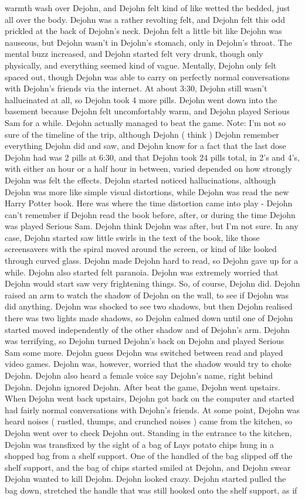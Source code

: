 \documentclass[12pt]{book}
\begin{document}
warmth wash over Dejohn, and Dejohn felt kind of like wetted the bedded, just all over the body. Dejohn was a rather revolting felt, and Dejohn felt this odd prickled at the back of Dejohn's neck. Dejohn felt a little bit like Dejohn was nauseous, but Dejohn wasn't in Dejohn's stomach, only in Dejohn's throat. The mental buzz increased, and Dejohn started felt very drunk, though only physically, and everything seemed kind of vague. Mentally, Dejohn only felt spaced out, though Dejohn was able to carry on perfectly normal conversations with Dejohn's friends via the internet. At about 3:30, Dejohn still wasn't hallucinated at all, so Dejohn took 4 more pills. Dejohn went down into the basement because Dejohn felt uncomfortably warm, and Dejohn played Serious Sam for a while. Dejohn actually managed to beat the game. Note: I'm not so sure of the timeline of the trip, although Dejohn ( think ) Dejohn remember everything Dejohn did and saw, and Dejohn know for a fact that the last dose Dejohn had was 2 pills at 6:30, and that Dejohn took 24 pills total, in 2's and 4's, with either an hour or a half hour in between, varied depended on how strongly Dejohn was felt the effects. Dejohn started noticed hallucinations, although Dejohn was more like simple visual distortions, while Dejohn was read the new Harry Potter book. Here was where the time distortion came into play - Dejohn can't remember if Dejohn read the book before, after, or during the time Dejohn was played Serious Sam. Dejohn think Dejohn was after, but I'm not sure. In any case, Dejohn started saw little swirls in the text of the book, like those screensavers with the spiral moved around the screen, or kind of like looked through curved glass. Dejohn made Dejohn hard to read, so Dejohn gave up for a while. Dejohn also started felt paranoia. Dejohn was extremely worried that Dejohn would start saw very frightening things. So, of course, Dejohn did. Dejohn raised an arm to watch the shadow of Dejohn on the wall, to see if Dejohn was did anything. Dejohn was shocked to see two shadows, but then Dejohn realised there was two lights made shadows, so Dejohn calmed down until one of Dejohn started moved independently of the other shadow and of Dejohn's arm. Dejohn was terrifying, so Dejohn turned Dejohn's back on Dejohn and played Serious Sam some more. Dejohn guess Dejohn was switched between read and played video games. Dejohn was, however, worried that the shadow would try to choke Dejohn. Dejohn also heard a female voice say Dejohn's name, right behind Dejohn. Dejohn ignored Dejohn. After beat the game, Dejohn went upstairs. When Dejohn went back upstairs, Dejohn got back on the computer and started had fairly normal conversations with Dejohn's friends. At some point, Dejohn was heard noises ( rustled, thumps, and crunched noises ) came from the kitchen, so Dejohn went over to check Dejohn out. Standing in the entrance to the kitchen, Dejohn was transfixed by the sight of a bag of Lays potato chips hung in a shopped bag from a shelf support. One of the handled of the bag slipped off the shelf support, and the bag of chips started smiled at Dejohn, and Dejohn swear Dejohn wanted to kill Dejohn. Dejohn looked crazy. Dejohn started pulled the bag down, stretched the handle that was still hooked onto the shelf support, as if 
\end{document}
